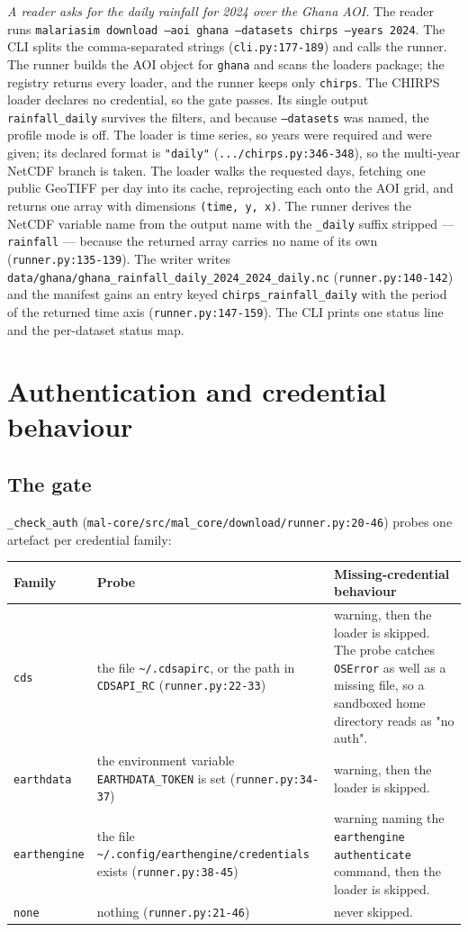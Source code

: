 \documentclass[11pt,a4paper]{article}
\newcommand{\code}[1]{\texttt{#1}}
\begin{document}
\emph{A reader asks for the daily rainfall for 2024 over the Ghana AOI.} The
reader runs \code{malariasim download --aoi ghana --datasets chirps --years
2024}. The CLI splits the comma-separated strings
(\code{cli.py:177-189}) and calls the runner. The runner builds the AOI
object for \code{ghana} and scans the loaders package; the registry returns
every loader, and the runner keeps only \code{chirps}. The CHIRPS loader
declares no credential, so the gate passes. Its single output
\code{rainfall\_daily} survives the filters, and because \code{--datasets}
was named, the profile mode is off. The loader is time series, so years were
required and were given; its declared format is \code{"daily"}
(\code{.../chirps.py:346-348}), so the multi-year NetCDF branch is taken. The
loader walks the requested days, fetching one public GeoTIFF per day into its
cache, reprojecting each onto the AOI grid, and returns one array with
dimensions \code{(time, y, x)}. The runner derives the NetCDF variable name
from the output name with the \code{\_daily} suffix stripped --- \code{rainfall}
--- because the returned array carries no name of its own
(\code{runner.py:135-139}). The writer writes
\code{data/ghana/ghana\_rainfall\_daily\_2024\_2024\_daily.nc}
(\code{runner.py:140-142}) and the manifest gains an entry keyed
\code{chirps\_rainfall\_daily} with the period of the returned time axis
(\code{runner.py:147-159}). The CLI prints one status line and the
per-dataset status map.

\section{Authentication and credential behaviour}
\label{sec:auth}

\subsection{The gate}

\code{\_check\_auth} (\code{mal-core/src/mal\_core/download/runner.py:20-46})
probes one artefact per credential family:

\small
\begin{longtable}{@{}p{1.9cm}p{5.2cm}p{}@{}}
\toprule
Family & Probe & Missing-credential behaviour \\
\midrule
\endhead
\code{cds} & the file \code{\textasciitilde/.cdsapirc}, or the path in
\code{CDSAPI\_RC} (\code{runner.py:22-33}) & warning, then the loader is
skipped. The probe catches \code{OSError} as well as a missing file, so a
sandboxed home directory reads as "no auth". \\
\code{earthdata} & the environment variable \code{EARTHDATA\_TOKEN} is set
(\code{runner.py:34-37}) & warning, then the loader is skipped. \\
\code{earthengine} & the file
\code{\textasciitilde/.config/\allowbreak earthengine/\allowbreak credentials}
exists (\code{runner.py:38-45}) & warning naming the \code{earthengine
authenticate} command, then the loader is skipped. \\
\code{none} & nothing (\code{runner.py:21-46}) & never skipped. \\
\bottomrule
\end{longtable}
\normalsize
\end{document}
